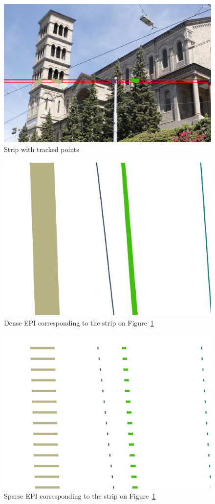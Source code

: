 \begin{itemize}
\begin{figure}[h!]
\centering
\includegraphics[width = 0.7 \textwidth]{./Diagrams/results/EPIs/424_8_102_7_10_4_strip.png}
\caption{Strip with tracked points}
\label{fig:strip2}
\end{figure}

\begin{figure}[h!]
\centering
\includegraphics[width = 0.7 \textwidth]{./Diagrams/results/EPIs/424_8_102_7_10_4_dense.png}
\caption{Dense EPI corresponding to the strip on Figure~\ref{fig:strip2}}
\label{fig:dense2}
\end{figure}

\begin{figure}[h!]
\centering
\includegraphics[width = 0.7 \textwidth]{./Diagrams/results/EPIs/424_8_102_7_10_4_sparse.png}
\caption{Sparse EPI corresponding to the strip on Figure~\ref{fig:strip2}}
\label{fig:sparse2}
\end{figure}


\end{itemize}
